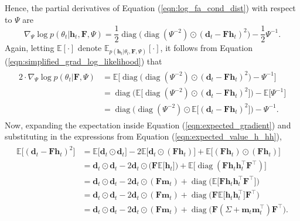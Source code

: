 \documentclass[msc,deptreport.inf]{infthesis} %
\newcommand{\matr}[1]{\mathbf{#1}}
\newcommand{\E}{\mathbb E}
\newcommand{\diag}{\mathop{\mathrm{diag}}}
\begin{document}
Hence, the partial derivatives of Equation (\ref{eqn:log_fa_cond_dist}) with respect to $\Psi$ are
\begin{equation}
	\nabla_{\Psi} \log p(\theta_t | \matr{h}_t, \matr{F}, \Psi)
	= \frac{1}{2} \diag\big(\diag(\Psi^{-2}) \odot (\matr{d}_t - \matr{Fh}_t)^2\big) - \frac{1}{2}\Psi^{-1}.
\end{equation}
Again, letting $\E[\cdot]$ denote $\E_{p(\matr{h}_t | \theta_t, \matr{F}, \Psi)}[\cdot]$, it follows from Equation (\ref{eqn:simplified_grad_log_likelihood}) that
\begin{align}\label{eqn:expected_gradient}
\begin{split}
	2 \cdot \nabla_{\Psi} \log p(\theta_t | \matr{F}, \Psi) 
	& = \E \big[ \diag\big(\diag(\Psi^{-2}) \odot (\matr{d}_t - \matr{Fh}_t)^2\big) - \Psi^{-1} \big] \\
	& = \diag\Big(\E \big[\diag(\Psi^{-2}) \odot (\matr{d}_t - \matr{Fh}_t)^2\big]\Big) - \E \big[ \Psi^{-1} \big] \\
	& = \diag\Big(\diag(\Psi^{-2}) \odot \E \big[(\matr{d}_t - \matr{Fh}_t)^2\big]\Big) - \Psi^{-1}.
\end{split}
\end{align} 
Now, expanding the expectation inside Equation (\ref{eqn:expected_gradient}) and substituting in the expressions from Equation (\ref{eqn:expected_value_h_hh}),
\begin{align}\label{eqn:expected_gradient_d_Fh}
\begin{split}
	\E \big[(\matr{d}_t - \matr{Fh}_t)^2\big] 
	& = \E \big[\matr{d}_t \odot \matr{d}_t \big] - 2\E \big[ \matr{d}_t \odot (\matr{Fh}_t) \big] + \E \big[ (\matr{Fh}_t) \odot (\matr{Fh}_t) \big] \\
	& = \matr{d}_t \odot \matr{d}_t - 2\matr{d}_t \odot \big(\matr{F} \E \big[ \matr{h}_t \big]\big) + \E \big[ \diag(\matr{F}\matr{h}_t \matr{h}_t^\intercal  \matr{F}^\intercal) \big] \\
	& = \matr{d}_t \odot \matr{d}_t - 2\matr{d}_t \odot (\matr{F} \matr{m}_t) + \diag\big(\E \big[ \matr{F}\matr{h}_t \matr{h}_t^\intercal  \matr{F}^\intercal \big]\big) \\
	& = \matr{d}_t \odot \matr{d}_t - 2\matr{d}_t \odot (\matr{F} \matr{m}_t) + \diag\big( \matr{F} \E \big[ \matr{h}_t \matr{h}_t^\intercal \big] \matr{F}^\intercal \big) \\
	& = \matr{d}_t \odot \matr{d}_t - 2\matr{d}_t \odot (\matr{F} \matr{m}_t) + \diag\big( \matr{F} (\Sigma + \matr{m}_t \matr{m}_t^\intercal) \matr{F}^\intercal \big).
\end{split}
\end{align} 
\end{document}

